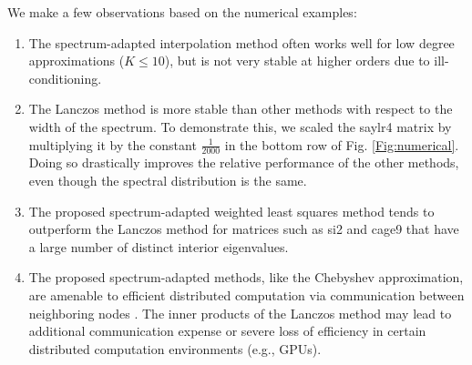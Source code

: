 \documentclass{article}
\begin{document}
We make a few observations based on the numerical examples: %
\begin{enumerate}
\item The spectrum-adapted interpolation method often works well for low degree approximations ($K\leq 10$), but is not very stable at higher orders due to ill-conditioning.
\item The Lanczos method is more stable than other methods with respect to the width of the spectrum. To demonstrate this, we scaled the saylr4 matrix by multiplying it by the constant $\frac{1}{2000}$ in the bottom row of Fig. \ref{Fig:numerical}. Doing so drastically improves the relative performance of the other methods, even though the spectral distribution is the same.
\item The proposed spectrum-adapted weighted least squares method tends to outperform the Lanczos method for matrices such as si2 and cage9 that have a large number of distinct interior eigenvalues.
\item The proposed spectrum-adapted methods, like the Chebyshev approximation, are amenable to efficient distributed computation via communication between neighboring nodes %
 \cite{shuman_distributed_SIPN_2018}. The inner products of the Lanczos method may lead to additional communication expense or severe loss of efficiency in certain distributed computation environments (e.g., GPUs). %
\end{enumerate}
\end{document}
